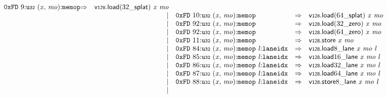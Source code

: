 $$\begin{array}{@{}l@{}rrlll@{}l@{}}
\mathtt{0xFD}~9{:}{\mathtt{u{\scriptstyle32}}}~({\mathit{x}},\, {\mathit{mo}}){:}{\mathtt{memop}} &\Rightarrow& {\mathsf{v{\scriptstyle128}.load}}{({{32}{\mathsf{\_}}}{\mathsf{splat}})}~{\mathit{x}}~{\mathit{mo}} \\ &&|&
\mathtt{0xFD}~10{:}{\mathtt{u{\scriptstyle32}}}~({\mathit{x}},\, {\mathit{mo}}){:}{\mathtt{memop}} &\Rightarrow& {\mathsf{v{\scriptstyle128}.load}}{({{64}{\mathsf{\_}}}{\mathsf{splat}})}~{\mathit{x}}~{\mathit{mo}} \\ &&|&
\mathtt{0xFD}~92{:}{\mathtt{u{\scriptstyle32}}}~({\mathit{x}},\, {\mathit{mo}}){:}{\mathtt{memop}} &\Rightarrow& {\mathsf{v{\scriptstyle128}.load}}{({{32}{\mathsf{\_}}}{\mathsf{zero}})}~{\mathit{x}}~{\mathit{mo}} \\ &&|&
\mathtt{0xFD}~92{:}{\mathtt{u{\scriptstyle32}}}~({\mathit{x}},\, {\mathit{mo}}){:}{\mathtt{memop}} &\Rightarrow& {\mathsf{v{\scriptstyle128}.load}}{({{64}{\mathsf{\_}}}{\mathsf{zero}})}~{\mathit{x}}~{\mathit{mo}} \\ &&|&
\mathtt{0xFD}~11{:}{\mathtt{u{\scriptstyle32}}}~({\mathit{x}},\, {\mathit{mo}}){:}{\mathtt{memop}} &\Rightarrow& \mathsf{v{\scriptstyle128}.store}~{\mathit{x}}~{\mathit{mo}} \\ &&|&
\mathtt{0xFD}~84{:}{\mathtt{u{\scriptstyle32}}}~({\mathit{x}},\, {\mathit{mo}}){:}{\mathtt{memop}}~{\mathit{l}}{:}{\mathtt{laneidx}} &\Rightarrow& {{{\mathsf{v{\scriptstyle128}.load}}{8}}{\mathsf{\_}}}{\mathsf{lane}}~{\mathit{x}}~{\mathit{mo}}~{\mathit{l}} \\ &&|&
\mathtt{0xFD}~85{:}{\mathtt{u{\scriptstyle32}}}~({\mathit{x}},\, {\mathit{mo}}){:}{\mathtt{memop}}~{\mathit{l}}{:}{\mathtt{laneidx}} &\Rightarrow& {{{\mathsf{v{\scriptstyle128}.load}}{16}}{\mathsf{\_}}}{\mathsf{lane}}~{\mathit{x}}~{\mathit{mo}}~{\mathit{l}} \\ &&|&
\mathtt{0xFD}~86{:}{\mathtt{u{\scriptstyle32}}}~({\mathit{x}},\, {\mathit{mo}}){:}{\mathtt{memop}}~{\mathit{l}}{:}{\mathtt{laneidx}} &\Rightarrow& {{{\mathsf{v{\scriptstyle128}.load}}{32}}{\mathsf{\_}}}{\mathsf{lane}}~{\mathit{x}}~{\mathit{mo}}~{\mathit{l}} \\ &&|&
\mathtt{0xFD}~87{:}{\mathtt{u{\scriptstyle32}}}~({\mathit{x}},\, {\mathit{mo}}){:}{\mathtt{memop}}~{\mathit{l}}{:}{\mathtt{laneidx}} &\Rightarrow& {{{\mathsf{v{\scriptstyle128}.load}}{64}}{\mathsf{\_}}}{\mathsf{lane}}~{\mathit{x}}~{\mathit{mo}}~{\mathit{l}} \\ &&|&
\mathtt{0xFD}~88{:}{\mathtt{u{\scriptstyle32}}}~({\mathit{x}},\, {\mathit{mo}}){:}{\mathtt{memop}}~{\mathit{l}}{:}{\mathtt{laneidx}} &\Rightarrow& {{{\mathsf{v{\scriptstyle128}.store}}{8}}{\mathsf{\_}}}{\mathsf{lane}}~{\mathit{x}}~{\mathit{mo}}~{\mathit{l}} \\ &&|&

\end{array}$$
